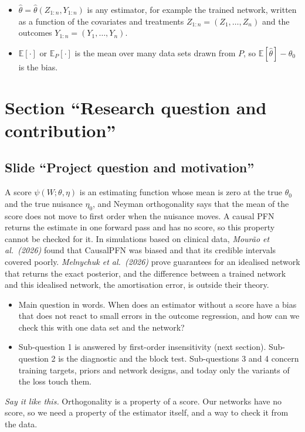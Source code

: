 \documentclass[10pt]{article}
\newcommand{\E}{\mathbb{E}}
\newcommand{\slide}[1]{\subsection*{Slide ``#1''}}
\newcommand{\say}[1]{\par\textit{Say it like this.} #1\par}
\begin{document}
\begin{itemize}
the ATE, $\alpha_0(d,x)=d/m_0(x)-(1-d)/\{1-m_0(x)\}$, the inverse propensity weight with a sign. To check it, note
that $\E[D\,g(D,X)/m_0(X)\mid X]=g(1,X)$, so $\E[\alpha_0(Z)g(Z)]=\E[g(1,X)-g(0,X)]$.
\item $\hat\theta=\hat\theta(Z_{1:n},Y_{1:n})$ is any estimator, for example the trained network, written as a function
of the covariates and treatments $Z_{1:n}=(Z_1,\dots,Z_n)$ and the outcomes $Y_{1:n}=(Y_1,\dots,Y_n)$.
\item $\E[\cdot]$ or $\E_P[\cdot]$ is the mean over many data sets drawn from $P$, so $\E[\hat\theta]-\theta_0$ is the
bias.
\end{itemize}

\section*{Section ``Research question and contribution''}

\slide{Project question and motivation}
A score $\psi(W;\theta,\eta)$ is an estimating function whose mean is zero at the true $\theta_0$ and the true
nuisance $\eta_0$, and Neyman orthogonality says that the mean of the score does not move to first order when the
nuisance moves. A causal PFN returns the estimate in one forward pass and has no score, so this property cannot be
checked for it. In simulations based on clinical data, \textit{Mour\~ao et al.\ (2026)} found that CausalPFN was
biased and that its credible intervals covered poorly. \textit{Melnychuk et al.\ (2026)} prove guarantees for an
idealised network that returns the exact posterior, and the difference between a trained network and this idealised
network, the amortisation error, is outside their theory.
\begin{itemize}
\item Main question in words. When does an estimator without a score have a bias that does not react to small errors in
the outcome regression, and how can we check this with one data set and the network?
\item Sub-question 1 is answered by first-order insensitivity (next section). Sub-question 2 is the diagnostic and the
block test. Sub-questions 3 and 4 concern training targets, priors and network designs, and today only the variants of
the loss touch them.
\end{itemize}
\say{Orthogonality is a property of a score. Our networks have no score, so we need a property of the estimator
itself, and a way to check it from the data.}
\end{document}
